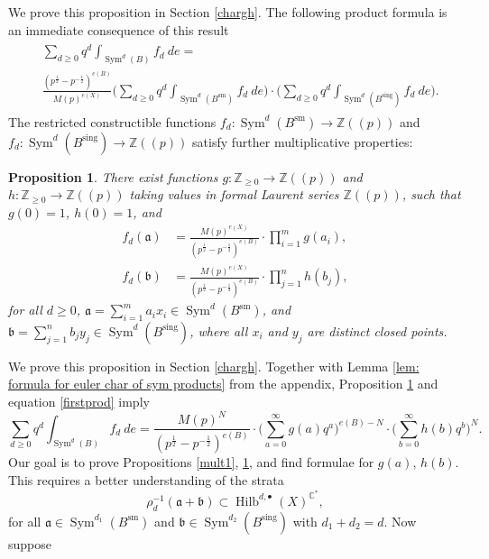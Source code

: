 \documentclass{amsart}
\newtheorem{proposition}[theorem]{Proposition}
\theoremstyle{definition}
\newcommand{\CC} {\mathbb{C}}          %
\newcommand{\ZZ} {\mathbb{Z}}		%
\newcommand{\Sym}{\operatorname{Sym}}
\newcommand{\Hilb}{\operatorname{Hilb}}
\newcommand{\sm}{\operatorname{sm}}
\newcommand{\sing}{\operatorname{sing}}
\begin{document}
We prove this proposition in Section \ref{chargh}. The following product formula is an immediate consequence of this result
\begin{align}
\begin{split} \label{firstprod}
&\sum_{d \geq 0} q^d \int_{\Sym^d(B)} f_d \ de = \\
&\frac{(p^{\frac{1}{2}} - p^{-\frac{1}{2}})^{e(B)}}{M(p)^{e(X)}}  \Bigg( \sum_{d \geq 0} q^d \int_{\Sym^d(B^{\sm})} f_d \ de \Bigg) \cdot \Bigg( \sum_{d \geq 0} q^d \int_{\Sym^d(B^{\sing})} f_d \ de \Bigg). 
\end{split}
\end{align}
The restricted constructible functions $f_d  : \Sym^d(B^{\sm}) \rightarrow \ZZ(\!(p)\!)$ and $f_d  : \Sym^d(B^{\sing}) \rightarrow \ZZ(\!(p)\!)$ satisfy further multiplicative properties:
\begin{proposition} \label{mult2}
There exist functions $g : \ZZ_{\geq 0} \rightarrow \ZZ(\!(p)\!)$ and $h : \ZZ_{\geq 0} \rightarrow \ZZ(\!(p)\!)$ taking values in formal Laurent series $\ZZ(\!(p)\!)$, such that $g(0)=1$, $h(0)=1$, and
\begin{align*}
f_{d}(\mathfrak{a}) &= \frac{M(p)^{e(X)}}{(p^{\frac{1}{2}} - p^{-\frac{1}{2}})^{e(B)}} \cdot \prod_{i=1}^m g(a_i), \\
f_{d}(\mathfrak{b}) &= \frac{M(p)^{e(X)}}{(p^{\frac{1}{2}} - p^{-\frac{1}{2}})^{e(B)}} \cdot \prod_{j=1}^n h(b_j), 
\end{align*}
for all $d \geq 0$, $\mathfrak{a} = \sum_{i=1}^m a_i x_i \in \Sym^{d}(B^{\sm})$, and $\mathfrak{b} = \sum_{j=1}^n b_j y_j \in \Sym^{d}(B^{\sing})$, where all $x_i$ and $y_j$ are distinct closed points.
\end{proposition}
We prove this proposition in Section \ref{chargh}. Together with Lemma \ref{lem: formula for euler char of sym products} from the appendix, Proposition \ref{mult2} and equation \eqref{firstprod} imply
\begin{equation} \label{initialprod}
\sum_{d \geq 0} q^d \int_{\Sym^d(B)} f_d \ de = \frac{M(p)^{N}}{(p^{\frac{1}{2}} - p^{-\frac{1}{2}})^{e(B)}} \cdot \Bigg( \sum_{a=0}^{\infty} g(a) q^a \Bigg)^{e(B) - N} \cdot \Bigg( \sum_{b=0}^{\infty} h(b) q^b \Bigg)^N.
\end{equation}
Our goal is to prove Propositions \ref{mult1}, \ref{mult2}, and find formulae for $g(a)$, $h(b)$. This requires a better understanding of the strata
$$
\rho_{d}^{-1} (\mathfrak{a} + \mathfrak{b}) \subset \Hilb^{d, \bullet}(X)^{\CC^*},
$$
for all $\mathfrak{a} \in \Sym^{d_1}(B^{\sm})$ and $\mathfrak{b} \in \Sym^{d_2}(B^{\sing})$ with $d_1+d_2=d$. Now suppose 
\end{document}
